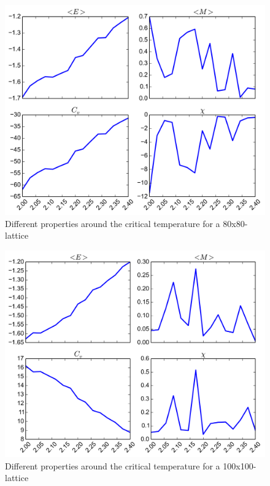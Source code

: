 \documentclass[11pt,a4paper,english,draft]{article}
\numberwithin{equation}{section}
\newcommand{\figurewidth}{.85\textwidth}
\begin{document}
\begin{figure}
\centering
\includegraphics[width=\figurewidth]{pics/e80.png}
\caption{Different properties around the critical temperature for 
a 80x80-lattice}
\label{fig:e80}
\end{figure}

\begin{figure}
\centering
\includegraphics[width=\figurewidth]{pics/e100.png}
\caption{Different properties around the critical temperature for 
a 100x100-lattice}
\label{fig:e100}
\end{figure}
\end{document}

